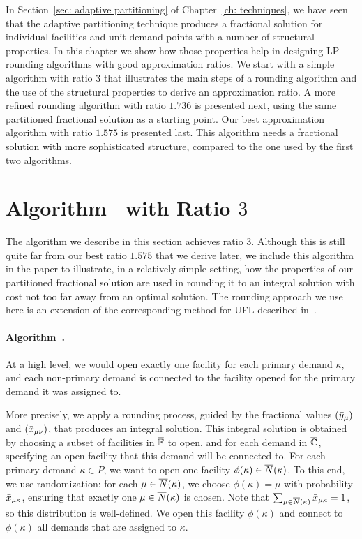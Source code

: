 \documentclass[oneside,final]{ucr}
\begin{document}
In Section~\ref{sec: adaptive partitioning} of
Chapter~\ref{ch: techniques}, we have seen that the adaptive
partitioning technique produces a fractional solution for
individual facilities and unit demand points with a number
of structural properties. In this chapter we show how those
properties help in designing LP-rounding algorithms with
good approximation ratios. We start with a simple algorithm
with ratio $3$ that illustrates the main steps of a rounding
algorithm and the use of the structural properties to derive
an approximation ratio. A more refined rounding algorithm
with ratio $1.736$ is presented next, using the same
partitioned fractional solution as a starting point. Our
best approximation algorithm with ratio $1.575$ is presented
last. This algorithm needs a fractional solution with more
sophisticated structure, compared to the one used by the
first two algorithms.

\section{Algorithm~{\EGUP} with Ratio $3$}
\label{sec: 3-approximation}

The algorithm we describe in this section achieves ratio
$3$. Although this is still quite far from our best ratio
$1.575$ that we derive later, we include this algorithm in
the paper to illustrate, in a relatively simple setting, how
the properties of our partitioned fractional solution are
used in rounding it to an integral solution with cost not
too far away from an optimal solution.  The rounding
approach we use here is an extension of the corresponding
method for UFL described in~\cite{gupta08}.

\paragraph{Algorithm~{\EGUP.}}
At a high level, we would open exactly one facility for each
primary demand $\kappa$, and each non-primary demand is
connected to the facility opened for the primary demand it
was assigned to.

More precisely, we apply a rounding process, guided by the
fractional values $({\bar y}_{\mu})$ and $({\bar x}_{\mu\nu})$,
that produces an integral solution. This integral solution
is obtained by choosing a subset of facilities in
$\overline{\mathbb{F}}$ to open, and for each demand in $\overline{\mathbb{C}}$,
specifying an open facility that this demand will be
connected to.  For each primary demand $\kappa\in P$, we
want to open one facility $\phi(\kappa) \in
{\overline{N}}(\kappa)$. To this end, we use randomization: for each
$\mu\in{\overline{N}}(\kappa)$, we choose $\phi(\kappa) = \mu$ with
probability ${\bar x}_{\mu\kappa}$, ensuring that exactly one
$\mu \in {\overline{N}}(\kappa)$ is chosen. Note that
$\sum_{\mu\in{\overline{N}}(\kappa)}{\bar x}_{\mu\kappa}=1$, so this
distribution is well-defined.  We open this facility
$\phi(\kappa)$ and connect to $\phi(\kappa)$ all demands
that are assigned to $\kappa$.
\end{document}

